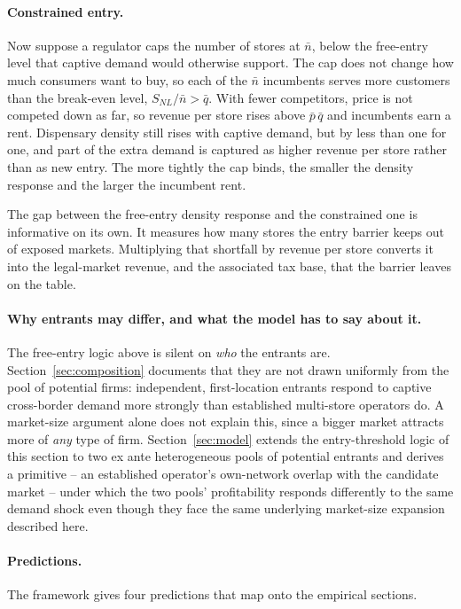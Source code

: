 \documentclass[english,12pt]{article}
\begin{document}
\paragraph{Constrained entry.} Now suppose a regulator caps the number of stores at $\bar n$, below the free-entry level that captive demand would otherwise support. The cap does not change how much consumers want to buy, so each of the $\bar n$ incumbents serves more customers than the break-even level, $S_{NL} / \bar n > \bar q$. With fewer competitors, price is not competed down as far, so revenue per store rises above $\bar p\,\bar q$ and incumbents earn a rent. Dispensary density still rises with captive demand, but by less than one for one, and part of the extra demand is captured as higher revenue per store rather than as new entry. The more tightly the cap binds, the smaller the density response and the larger the incumbent rent.

The gap between the free-entry density response and the constrained one is informative on its own. It measures how many stores the entry barrier keeps out of exposed markets. Multiplying that shortfall by revenue per store converts it into the legal-market revenue, and the associated tax base, that the barrier leaves on the table.

\paragraph{Why entrants may differ, and what the model has to say about it.} The free-entry logic above is silent on \emph{who} the entrants are. Section~\ref{sec:composition} documents that they are not drawn uniformly from the pool of potential firms: independent, first-location entrants respond to captive cross-border demand more strongly than established multi-store operators do. A market-size argument alone does not explain this, since a bigger market attracts more of \emph{any} type of firm. Section~\ref{sec:model} extends the entry-threshold logic of this section to two ex ante heterogeneous pools of potential entrants and derives a primitive -- an established operator's own-network overlap with the candidate market -- under which the two pools' profitability responds differently to the same demand shock even though they face the same underlying market-size expansion described here.

\paragraph{Predictions.} The framework gives four predictions that map onto the empirical sections.
\end{document}
